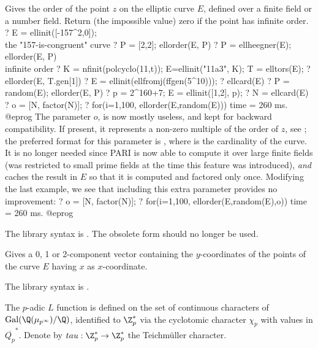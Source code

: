 \label{se:ellorder}
Gives the order of the point $z$ on the elliptic
curve $E$, defined over a finite field or a number field.
Return (the impossible value) zero if the point has infinite order.
\bprog
? E = ellinit([-157^2,0]);  \\ the "157-is-congruent" curve
? P = [2,2]; ellorder(E, P)
? P = ellheegner(E); ellorder(E, P) \\ infinite order
? K = nfinit(polcyclo(11,t)); E=ellinit("11a3", K); T = elltors(E);
? ellorder(E, T.gen[1])
? E = ellinit(ellfromj(ffgen(5^10)));
? ellcard(E)
? P = random(E); ellorder(E, P)
? p = 2^160+7; E = ellinit([1,2], p);
? N = ellcard(E)
? o = [N, factor(N)];
? for(i=1,100, ellorder(E,random(E)))
time = 260 ms.
@eprog
The parameter $o$, is now mostly useless, and kept for backward
compatibility. If present, it represents a non-zero multiple of the order
of $z$, see ; the preferred format for this parameter is
, where  is the cardinality of the curve.
It is no longer needed since PARI is now able to compute it over large
finite fields (was restricted to small prime fields at the time this feature
was introduced), \emph{and} caches the result in $E$ so that it is computed
and factored only once. Modifying the last example, we see that including
this extra parameter provides no improvement:
\bprog
? o = [N, factor(N)];
? for(i=1,100, ellorder(E,random(E),o))
time = 260 ms.
@eprog

The library syntax is .
The obsolete form  should no longer be
used.

\label{se:ellordinate}
Gives a 0, 1 or 2-component vector containing
the $y$-coordinates of the points of the curve $E$ having $x$ as
$x$-coordinate.

The library syntax is .

\label{se:ellpadicL}
The $p$-adic $L$ function is defined on the set of continuous characters
 of $\text{Gal}(\Q(\mu_{p^{\infty}})/ \Q)$, identified to $\Z_p^*$
 via the cyclotomic character $\chi_p$ with values in $\overline{Q_p}^*$.
 Denote by $tau:\Z_p^*\to\Z_p^*$ the Teichm\"uller character.

